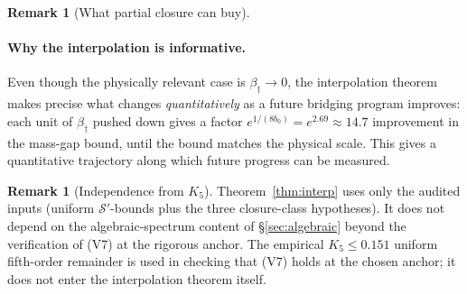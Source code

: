 \documentclass[11pt]{article}
\theoremstyle{definition}
\newtheorem{remark}[theorem]{Remark}
\begin{document}
\begin{remark}[What partial closure can buy]
\paragraph{Why the interpolation is informative.}  Even though the
physically relevant case is $\beta_\dagger\to 0$, the interpolation
theorem makes precise what changes \emph{quantitatively} as a future
bridging program improves: each unit of $\beta_\dagger$ pushed down
gives a factor $e^{1/(8b_0)} = e^{2.69} \approx 14.7$ improvement in
the mass-gap bound, until the bound matches the physical scale.  This
gives a quantitative trajectory along which future progress can be
measured.
\end{remark}

\begin{remark}[Independence from $K_5$]
\label{rem:partial-K5}
Theorem~\ref{thm:interp} uses only the audited inputs (uniform
$\mathcal S'$-bounds plus the three closure-class hypotheses).  It does
not depend on the algebraic-spectrum content of \S\ref{sec:algebraic}
beyond the verification of (V7) at the rigorous anchor.  The empirical
$K_5\le 0.151$ uniform fifth-order remainder is used in checking
that (V7) holds at the chosen anchor; it does not enter the
interpolation theorem itself.
\end{remark}
\end{document}
